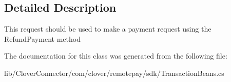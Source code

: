 \subsection{Detailed Description}
This request should be used to make a payment request using the Refund\+Payment method 



The documentation for this class was generated from the following file\+:\begin{DoxyCompactItemize}
\item 
lib/\+Clover\+Connector/com/clover/remotepay/sdk/Transaction\+Beans.\+cs\end{DoxyCompactItemize}
